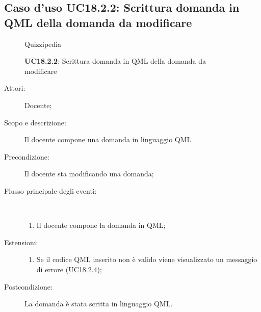\subsection{Caso d'uso UC18.2.2: Scrittura domanda in QML della domanda da modificare}
\begin{figure}[H]
	\centering
	\begin{resizedtikzpicture}{\textwidth}
		\begin{umlsystem}[x=0, fill=lightgray!20]{Quizzipedia}
		\end{umlsystem}
	\end{resizedtikzpicture}
	\caption{\textbf{UC18.2.2}: Scrittura domanda in QML della domanda da modificare}
	\label{UC18.2.2}
\end{figure}
\begin{description}
	\item[Attori:] Docente;
	\item[Scopo e descrizione:] Il docente compone una domanda in linguaggio QML
	\item[Precondizione:] Il docente sta modificando una domanda;
	
	\item[Flusso principale degli eventi:] \ 
	\begin{enumerate}
		\item Il docente compone la domanda in QML;
		
	\end{enumerate}
	\item[Estensioni:]
	\begin{enumerate}
		\item Se il codice QML inserito non è valido viene visualizzato un messaggio di errore (\hyperlink{UC18.2.4}{UC18.2.4});
		
	\end{enumerate}
	\item[Postcondizione:] La domanda è stata scritta in linguaggio QML.
\end{description}
\hypertarget{UC18.2.3}{}
